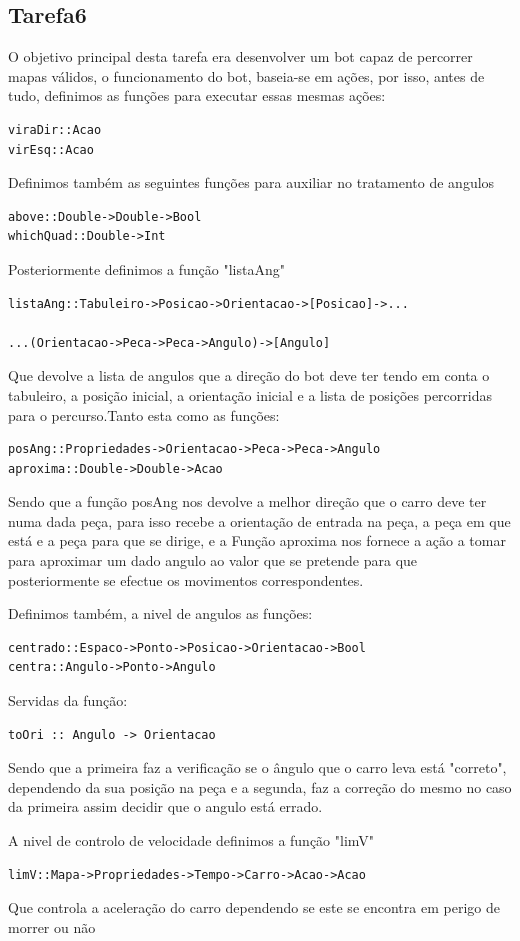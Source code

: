 \documentclass[a4paper]{report} %
\begin{document}
\subsection{Tarefa6}
O objetivo principal desta tarefa era desenvolver um bot capaz de percorrer mapas válidos, o funcionamento do bot, baseia-se em ações, por isso, antes de tudo, definimos as funções para executar essas mesmas ações:
\begin{verbatim}
viraDir::Acao
virEsq::Acao
\end{verbatim}
Definimos também as seguintes funções para auxiliar no tratamento de angulos
\begin{verbatim}
above::Double->Double->Bool
whichQuad::Double->Int
\end{verbatim}
Posteriormente definimos a função "listaAng"
\begin{verbatim}
listaAng::Tabuleiro->Posicao->Orientacao->[Posicao]->...

...(Orientacao->Peca->Peca->Angulo)->[Angulo]
\end{verbatim}
Que devolve a lista de angulos que a direção do bot deve ter tendo em conta o tabuleiro, a posição inicial, a orientação inicial e a lista de posições percorridas para o percurso.Tanto esta como as funções:
\begin{verbatim}
posAng::Propriedades->Orientacao->Peca->Peca->Angulo
aproxima::Double->Double->Acao
\end{verbatim}

Sendo que a função posAng nos devolve a melhor direção que o carro deve ter numa dada
peça, para isso recebe a orientação de entrada na peça, a peça em que está e a peça
para que se dirige, e a Função aproxima nos fornece a ação a tomar para aproximar um dado
angulo ao valor que se pretende para que posteriormente se efectue os movimentos correspondentes.

Definimos também, a nivel de angulos as funções:
\begin{verbatim}
centrado::Espaco->Ponto->Posicao->Orientacao->Bool
centra::Angulo->Ponto->Angulo
\end{verbatim}
Servidas da função:
\begin{verbatim}
toOri :: Angulo -> Orientacao
\end{verbatim}
Sendo que a primeira faz a verificação se o ângulo que o carro leva está "correto", dependendo da sua posição na peça e a segunda, faz a correção do mesmo no caso da primeira assim decidir que o angulo está errado.

A nivel de controlo de velocidade definimos a função "limV"
\begin{verbatim}
limV::Mapa->Propriedades->Tempo->Carro->Acao->Acao
\end{verbatim}
Que controla a aceleração do carro dependendo se este se encontra em perigo de morrer ou não
\end{document}
